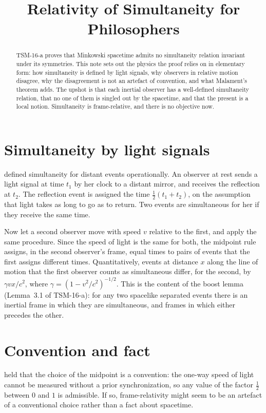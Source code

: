 \documentclass{situationist-preprint}
\title{Relativity of Simultaneity for Philosophers}
\begin{document}
\maketitle

\begin{abstract}
TSM-16-a proves that Minkowski spacetime admits no simultaneity relation invariant under its symmetries. This note sets out the physics the proof relies on in elementary form: how simultaneity is defined by light signals, why observers in relative motion disagree, why the disagreement is not an artefact of convention, and what Malament's theorem adds. The upshot is that each inertial observer has a well-defined simultaneity relation, that no one of them is singled out by the spacetime, and that the present is a local notion. Simultaneity is frame-relative, and there is no objective now.
\end{abstract}

\section{Simultaneity by light signals}

\citet{Einstein1905} defined simultaneity for distant events operationally. An observer at rest sends a light signal at time $t_1$ by her clock to a distant mirror, and receives the reflection at $t_2$. The reflection event is assigned the time $\tfrac{1}{2}(t_1 + t_2)$, on the assumption that light takes as long to go as to return. Two events are simultaneous for her if they receive the same time.

Now let a second observer move with speed $v$ relative to the first, and apply the same procedure. Since the speed of light is the same for both, the midpoint rule assigns, in the second observer's frame, equal times to pairs of events that the first assigns different times. Quantitatively, events at distance $x$ along the line of motion that the first observer counts as simultaneous differ, for the second, by $\gamma v x / c^2$, where $\gamma = (1 - v^2/c^2)^{-1/2}$. This is the content of the boost lemma (Lemma~3.1 of TSM-16-a): for any two spacelike separated events there is an inertial frame in which they are simultaneous, and frames in which either precedes the other.

\section{Convention and fact}

\citet{Reichenbach1958} held that the choice of the midpoint is a convention: the one-way speed of light cannot be measured without a prior synchronization, so any value of the factor $\tfrac{1}{2}$ between $0$ and $1$ is admissible. If so, frame-relativity might seem to be an artefact of a conventional choice rather than a fact about spacetime.
\end{document}
